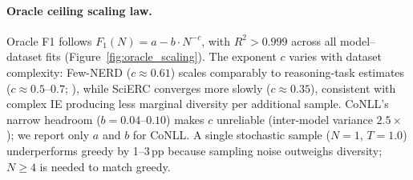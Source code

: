 \begin{table}[t]
\centering
\small
\caption{Bootstrap significance test at $N{=}32$ (SciERC NER, Qwen3-8B, $T{=}1.0$, $B{=}10{,}000$, $n{=}529$ gold-non-empty instances; 22 instances with no gold entities are excluded as they contribute zero selection differential). $\Delta$: selection gain vs.\ greedy. CI: 95\% bootstrap percentile interval. $p_{\text{greedy}}$: one-sided $p$-value vs.\ greedy; $p_{\text{rand}}$: permutation test vs.\ random selection.}
\label{tab:bootstrap_n32}
\end{table}

\paragraph{Oracle ceiling scaling law.}
Oracle F1 follows $F_1(N) = a - b \cdot N^{-c}$, with $R^2 > 0.999$ across all model--dataset fits (Figure~\ref{fig:oracle_scaling}).
The exponent $c$ varies with dataset complexity: Few-NERD ($c{\approx}0.61$) scales comparably to reasoning-task estimates ($c{\approx}0.5$--$0.7$; \citealp{brown2024monkeys}), while SciERC converges more slowly ($c{\approx}0.35$), consistent with complex IE producing less marginal diversity per additional sample.
CoNLL's narrow headroom ($b{=}0.04$--$0.10$) makes $c$ unreliable (inter-model variance $2.5{\times}$); we report only $a$ and $b$ for CoNLL.
A single stochastic sample ($N{=}1$, $T{=}1.0$) underperforms greedy by 1--3\,pp because sampling noise outweighs diversity; $N{\geq}4$ is needed to match greedy.


